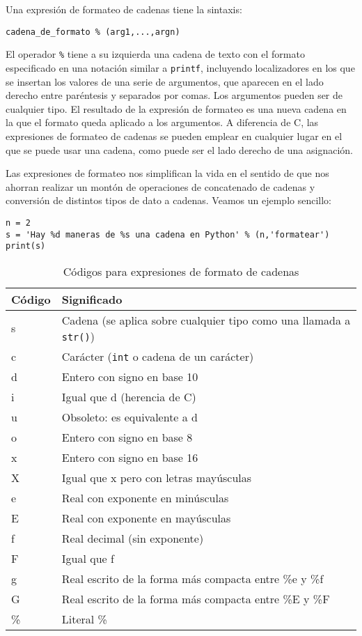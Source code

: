 Una expresión de formateo de cadenas tiene la sintaxis:

\texttt{cadena\_de\_formato \% (arg1,...,argn)}

El operador \texttt{\%} tiene a su izquierda una cadena de texto con el formato especificado en una notación similar a \texttt{printf}, incluyendo localizadores en los que se insertan los valores de una serie de argumentos, que aparecen en el lado derecho entre paréntesis y separados por comas. Los argumentos pueden ser de cualquier tipo. El resultado de la expresión de formateo es una nueva cadena en la que el formato queda aplicado a los argumentos. A diferencia de C, las expresiones de formateo de cadenas se pueden emplear en cualquier lugar en el que se puede usar una cadena, como puede ser el lado derecho de una asignación.

Las expresiones de formateo nos simplifican la vida en el sentido de que nos ahorran realizar un montón de operaciones de concatenado de cadenas y conversión de distintos tipos de dato a cadenas. Veamos un ejemplo sencillo:
\begin{lstlisting}
n = 2
s = 'Hay %d maneras de %s una cadena en Python' % (n,'formatear')
print(s)
\end{lstlisting}

\begin{table}
\begin{center}
\begin{tabular}{ll}
	Código & Significado\\
	\hline\hline
	s & Cadena (se aplica sobre cualquier tipo como una llamada a \texttt{str()})\\
	c & Carácter (\texttt{int} o cadena de un carácter)\\
	d & Entero con signo en base 10\\
	i & Igual que d (herencia de C)\\
	u & Obsoleto: es equivalente a d\\
	o & Entero con signo en base 8\\
	x & Entero con signo en base 16\\
	X & Igual que x pero con letras mayúsculas\\
	e & Real con exponente en minúsculas\\
	E & Real con exponente en mayúsculas\\
	f & Real decimal (sin exponente)\\
	F & Igual que f\\
	g & Real escrito de la forma más compacta entre \%e y \%f\\
	G & Real escrito de la forma más compacta entre \%E y \%F\\
	\% & Literal \%\\
	\hline
\end{tabular}
\caption{Códigos para expresiones de formato de cadenas}
\label{tab:formatoCadenas}
\end{center}
\end{table}

